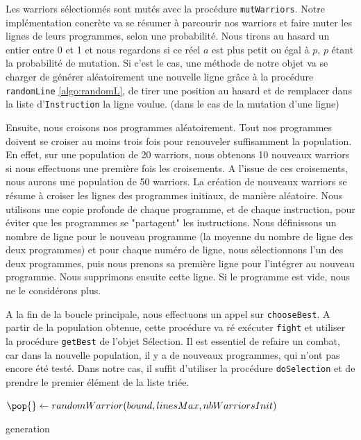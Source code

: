 \documentclass[hidelinks]{report}
\begin{document}
Les warriors sélectionnés sont mutés avec la procédure \texttt{mutWarriors}. Notre implémentation concrète va se résumer à parcourir nos warriors et faire muter les lignes de leurs programmes, selon une probabilité. Nous tirons au hasard un entier entre 0 et 1 et nous regardons si ce réel $a$ est plus petit ou égal à $p$, $p$ étant la probabilité de mutation. Si c'est le cas, une méthode de notre objet va se charger de générer aléatoirement une nouvelle ligne grâce à la procédure \texttt{randomLine} \autoref{algo:randomL}, de tirer une position au hasard et de remplacer dans la liste d'\texttt{Instruction} la ligne voulue. (dans le cas de la mutation d'une ligne)

Ensuite, nous croisons nos programmes aléatoirement. Tout nos programmes doivent se croiser au moins trois fois pour renouveler suffisamment la population. En effet, sur une population de 20 warriors, nous obtenons 10 nouveaux warriors si nous effectuons une première fois les croisements. A l'issue de ces croisements, nous aurons une population de 50 warriors. La création de nouveaux warriors se résume à croiser les lignes des programmes initiaux, de manière aléatoire. Nous utilisons une copie profonde de chaque programme, et de chaque instruction, pour éviter que les programmes se "partagent" les instructions. Nous définissons un nombre de ligne pour le nouveau programme (la moyenne du nombre de ligne des deux programmes) et pour chaque numéro de ligne, nous sélectionnons l'un des deux programmes, puis nous prenons sa première ligne pour l'intégrer au nouveau programme. Nous supprimons ensuite cette ligne. Si le programme est vide, nous ne le considérons plus.


A la fin de la boucle principale, nous effectuons un appel sur \texttt{chooseBest}. A partir de la population obtenue, cette procédure va ré exécuter \texttt{fight} et utiliser la procédure \texttt{getBest} de l'objet Sélection. Il est essentiel de refaire un combat, car dans la nouvelle population, il y a de nouveaux programmes, qui n'ont pas encore été testé. Dans notre cas, il suffit d'utiliser la procédure \texttt{doSelection} et de prendre le premier élément de la liste triée.
\begin{algorithm}
\DontPrintSemicolon
{}
$\pop{} \gets randomWarrior(bound,linesMax,nbWarriorsInit)$\;

\caption{\sc generation}
\label{algo:generation}
\end{algorithm}
\end{document}
